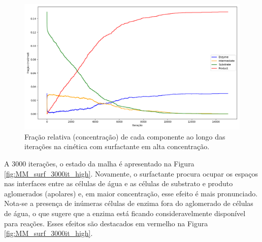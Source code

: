 \documentclass[12pt,oneside]{report}
\begin{document}
\begin{figure}[H]
    \centering
    \includegraphics[width=1\textwidth]{img/MM_surf_conc_high.png}
    \caption{\small Fração relativa (concentração) de cada componente ao longo das iterações na cinética com surfactante em alta concentração.}
    \label{fig:MM_surf_conc_high}
\end{figure}

A 3000 iterações, o estado da malha é apresentado na Figura \ref{fig:MM_surf_3000it_high}. Novamente, o surfactante procura ocupar os espaços nas interfaces entre as células de água e as células de substrato e produto aglomerados (apolares) e, em maior concentração, esse efeito é mais pronunciado. Nota-se a presença de inúmeras células de enzima fora do aglomerado de células de água, o que sugere que a enzima está ficando consideravelmente disponível para reações. Esses efeitos são destacados em vermelho na Figura \ref{fig:MM_surf_3000it_high}.
\end{document}
